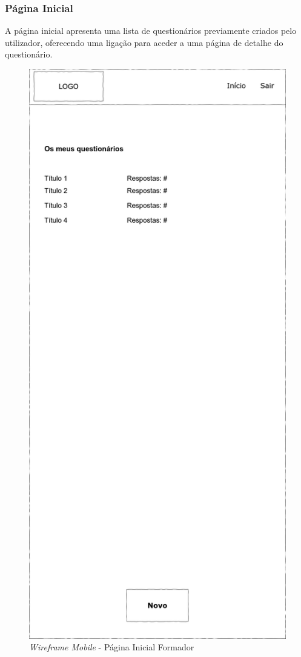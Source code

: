 \documentclass[12pt,a4paper,final]{article}
\begin{document}
    \subsubsection{Página Inicial}
    A página inicial apresenta uma lista de questionários previamente criados pelo utilizador, oferecendo uma ligação para aceder a uma página de detalhe do questionário.

    \begin{figure}[H]
        \centering
        \includegraphics[width=\textwidth,height=0.9\textheight,keepaspectratio]{wireframes/questionarios.wireframes-formador-geral-mobile.drawio}
        \caption{\textit{Wireframe Mobile} - Página Inicial Formador}
        \label{fig:wm-pif}
    \end{figure}
\end{document}
